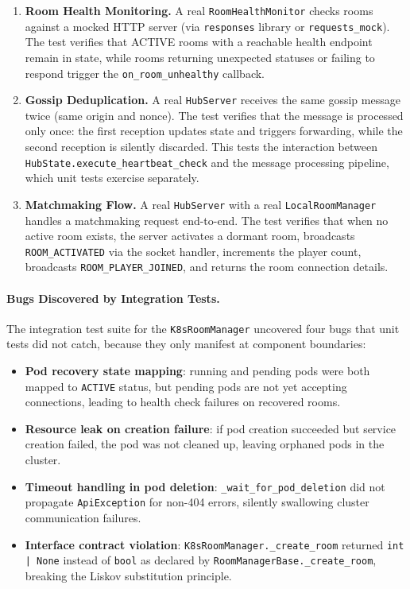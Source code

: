 \begin{enumerate}
    \item \textbf{Room Health Monitoring.}
          A real \texttt{RoomHealthMonitor} checks rooms against a mocked HTTP server (via \texttt{responses} library or \texttt{requests\_mock}).
          The test verifies that ACTIVE rooms with a reachable health endpoint remain in state, while rooms returning unexpected statuses or failing to respond trigger the \texttt{on\_room\_unhealthy} callback.

    \item \textbf{Gossip Deduplication.}
          A real \texttt{HubServer} receives the same gossip message twice (same origin and nonce).
          The test verifies that the message is processed only once: the first reception updates state and triggers forwarding, while the second reception is silently discarded.
          This tests the interaction between \texttt{HubState.execute\_heartbeat\_check} and the message processing pipeline, which unit tests exercise separately.

    \item \textbf{Matchmaking Flow.}
          A real \texttt{HubServer} with a real \texttt{LocalRoomManager} handles a matchmaking request end-to-end.
          The test verifies that when no active room exists, the server activates a dormant room, broadcasts \texttt{ROOM\_ACTIVATED} via the socket handler, increments the player count, broadcasts \texttt{ROOM\_PLAYER\_JOINED}, and returns the room connection details.
\end{enumerate}

\paragraph{Bugs Discovered by Integration Tests.}
The integration test suite for the \texttt{K8sRoomManager} uncovered four bugs that unit tests did not catch, because they only manifest at component boundaries:
\begin{itemize}
    \item \textbf{Pod recovery state mapping}: running and pending pods were both mapped to \texttt{ACTIVE} status, but pending pods are not yet accepting connections, leading to health check failures on recovered rooms.
    \item \textbf{Resource leak on creation failure}: if pod creation succeeded but service creation failed, the pod was not cleaned up, leaving orphaned pods in the cluster.
    \item \textbf{Timeout handling in pod deletion}: \texttt{\_wait\_for\_pod\_deletion} did not propagate \texttt{ApiException} for non-404 errors, silently swallowing cluster communication failures.
    \item \textbf{Interface contract violation}: \texttt{K8sRoomManager.\_create\_room} returned \texttt{int | None} instead of \texttt{bool} as declared by \texttt{RoomManagerBase.\_create\_room}, breaking the Liskov substitution principle.
\end{itemize}

